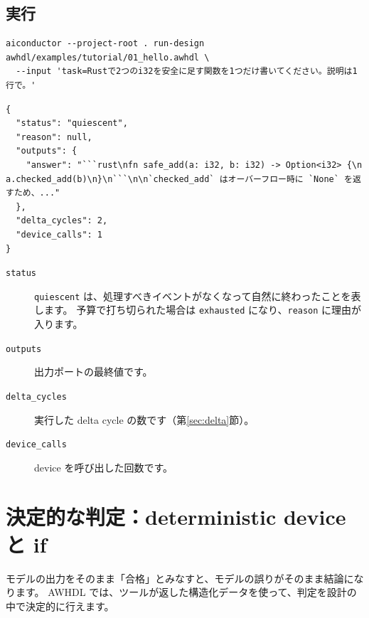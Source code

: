 \documentclass[a4paper,11pt]{ltjsarticle}
\newcommand{\ex}[1]{\texttt{examples/tutorial/#1}}
\begin{document}
\subsection{実行}

\begin{lstlisting}[style=shell]
aiconductor --project-root . run-design awhdl/examples/tutorial/01_hello.awhdl \
  --input 'task=Rustで2つのi32を安全に足す関数を1つだけ書いてください。説明は1行で。'
\end{lstlisting}

\begin{lstlisting}[style=shell,caption={実行結果（27B モデル、約 4 秒）}]
{
  "status": "quiescent",
  "reason": null,
  "outputs": {
    "answer": "```rust\nfn safe_add(a: i32, b: i32) -> Option<i32> {\n    a.checked_add(b)\n}\n```\n\n`checked_add` はオーバーフロー時に `None` を返すため、..."
  },
  "delta_cycles": 2,
  "device_calls": 1
}
\end{lstlisting}

\begin{description}
  \item[\texttt{status}] \texttt{quiescent} は、処理すべきイベントがなくなって自然に終わったことを表します。
    予算で打ち切られた場合は \texttt{exhausted} になり、\texttt{reason} に理由が入ります。
  \item[\texttt{outputs}] 出力ポートの最終値です。
  \item[\texttt{delta\_cycles}] 実行した delta cycle の数です（第\ref{sec:delta}節）。
  \item[\texttt{device\_calls}] device を呼び出した回数です。
\end{description}

\section{決定的な判定：deterministic device と if}

モデルの出力をそのまま「合格」とみなすと、モデルの誤りがそのまま結論になります。
AWHDL では、ツールが返した構造化データを使って、判定を設計の中で決定的に行えます。


\end{document}
